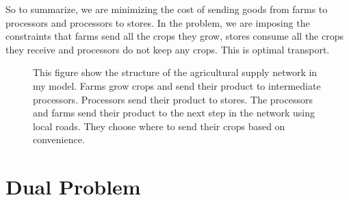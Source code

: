 \documentclass{report}
\begin{document}
So to summarize, we are minimizing the cost of sending goods from farms to processors and processors to stores. In the problem, we are imposing the constraints that farms send all the crops they grow, stores consume all the crops they receive and processors do not keep any crops. This is  optimal transport.

\begin{figure}
\centering
\begin{framed}
\caption{This figure show the structure of the agricultural supply network in my model. Farms grow crops and send their product to intermediate processors. Processors send their product to stores. The processors and farms send their product to the next step in the network using local roads. They choose where to send their crops based on convenience.}
\label{fig:spec}
\end{framed}
\end{figure}

\section{Dual Problem}
\end{document}
